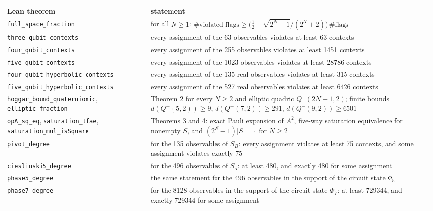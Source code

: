 \documentclass[11pt,a4paper]{article}
\begin{document}
{\def\LTcaptype{none} %
{\small
\begin{longtable}[]{@{}>{\raggedright\arraybackslash}p{}>{\raggedright\arraybackslash}p{}@{}}
\toprule\noalign{}
Lean theorem & statement \\
\midrule\noalign{}
\endhead
\bottomrule\noalign{}
\endlastfoot
\nolinkurl{full_space_fraction} & for all \(N \ge 1\): \(\#\text{violated flags} \ge \big(\tfrac12 - \sqrt{2^N+1}/(2^N+2)\big)\,\#\text{flags}\) \\
\nolinkurl{three_qubit_contexts} & every assignment of the 63 observables violates at least 63 contexts \\
\nolinkurl{four_qubit_contexts} & every assignment of the 255 observables violates at least 1451 contexts \\
\nolinkurl{five_qubit_contexts} & every assignment of the 1023 observables violates at least 28786 contexts \\
\nolinkurl{four_qubit_hyperbolic_contexts} & every assignment of the 135 real observables violates at least 315 contexts \\
\nolinkurl{five_qubit_hyperbolic_contexts} & every assignment of the 527 real observables violates at least 6426 contexts \\
\nolinkurl{hoggar_bound_quaternionic}, \texttt{elliptic\_fraction} & Theorem 2 for every \(N \ge 2\) and elliptic quadric \(Q^-(2N-1,2)\); finite bounds \(d(Q^-(5,2))\ge9\), \(d(Q^-(7,2))\ge291\), \(d(Q^-(9,2))\ge6501\) \\
\texttt{opA\_sq\_eq}, \texttt{saturation\_tfae}, \nolinkurl{saturation_mul_isSquare} & Theorems 3 and 4: exact Pauli expansion of \(A^2\), five-way saturation equivalence for nonempty \(S\), and \((2^N-1)\vert S\vert=\square\) for \(N\ge2\) \\
\texttt{pivot\_degree} & for the 135 observables of \(S_B\): every assignment violates at least 75 contexts, and some assignment violates exactly 75 \\
\nolinkurl{cieslinski5_degree} & for the 496 observables of \(S_5\): at least 480, and exactly 480 for some assignment \\
\texttt{phase5\_degree} & the same statement for the 496 observables in the support of the circuit state \(\Phi_5\) \\
\texttt{phase7\_degree} & for the 8128 observables in the support of the circuit state \(\Phi_7\): at least 729344, and exactly 729344 for some assignment \\

\end{longtable}}}
\end{document}
